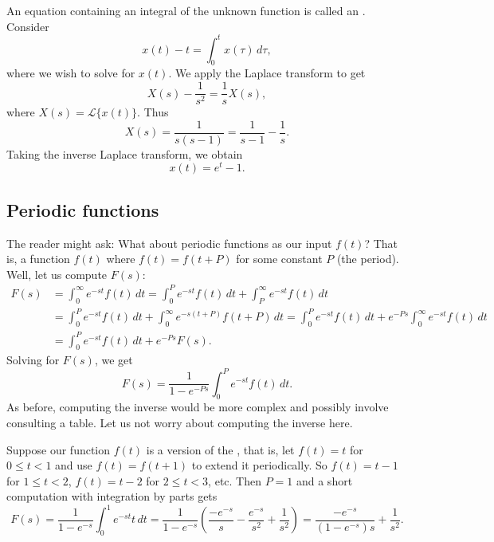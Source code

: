 \begin{example}
An equation containing an integral of the unknown function is
called an \emph{}.
Consider
\begin{equation*}
x(t) - t = \int_0^t x(\tau) \, d\tau ,
\end{equation*}
where we wish to solve for $x(t)$.
We apply the Laplace transform to get
\begin{equation*}
X(s) - \frac{1}{s^2} = \frac{1}{s} X(s) ,
\end{equation*}
where $X(s) = \mathcal{L} \bigl\{ x(t) \bigr\}$.  Thus
\begin{equation*}
X(s) = \frac{1}{s(s-1)} = \frac{1}{s-1} - \frac{1}{s} .
\end{equation*}
Taking the inverse Laplace transform, we obtain
\begin{equation*}
x(t) = e^t - 1 .
\end{equation*}
\end{example}

\subsection{Periodic functions}

The reader might ask: What about periodic functions as our input $f(t)$?
That is, a function $f(t)$ where $f(t) = f(t+P)$ for some constant $P$ (the period).
Well, let us compute $F(s)$:
\begin{equation*}
\begin{split}
F(s)
& = \int_0^\infty e^{-st} f(t) \, dt
= \int_0^P e^{-st} f(t) \, dt
+ \int_P^\infty e^{-st} f(t) \, dt
\\
& = \int_0^P e^{-st} f(t) \, dt
+ \int_0^\infty e^{-s(t+P)} f(t+P) \, dt
= \int_0^P e^{-st} f(t) \, dt
+ e^{-Ps} \int_0^\infty e^{-st} f(t) \, dt
\\
& = \int_0^P e^{-st} f(t) \, dt
+ e^{-Ps} F(s) .
\end{split}
\end{equation*}
Solving for $F(s)$, we get
\begin{equation*}
F(s)
=
\frac{1}{1-e^{-Ps}}
\int_0^P e^{-st} f(t) \, dt .
\end{equation*}
As before, computing the inverse would be more complex and possibly
involve consulting a table.  Let us not worry about computing the inverse
here.

\begin{example}
Suppose our function $f(t)$ is a version of the \emph{}, that is,
let
$f(t) = t$ for $0 \leq t < 1$
and use $f(t)=f(t+1)$ to extend it periodically.  So
$f(t) = t-1$ for $1 \leq t < 2$, 
$f(t) = t-2$ for $2 \leq t < 3$, etc.  Then $P=1$ and
a short computation with integration by parts gets
\begin{equation*}
F(s) =
\frac{1}{1-e^{-s}}
\int_0^1 e^{-st} t \, dt 
=
\frac{1}{1-e^{-s}}
\left(
\frac{-e^{-s}}{s}-\frac{e^{-s}}{s^2} + \frac{1}{s^2}
\right)
=
\frac{-e^{-s}}{(1-e^{-s})s} + \frac{1}{s^2} .
\end{equation*}
\end{example}

